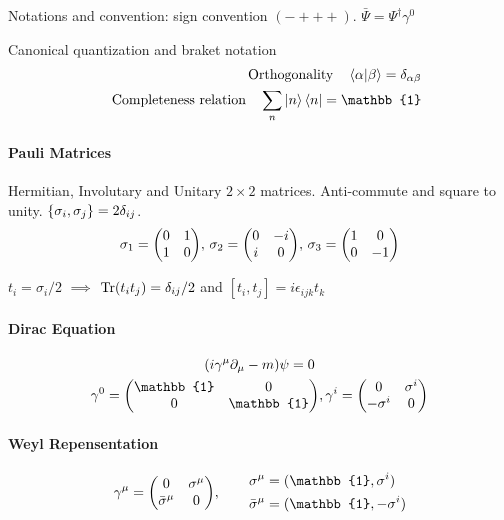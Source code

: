 \documentclass[main]{subfiles}
\begin{document}
\begin{multicols}{2}
    Notations and convention: sign convention $(-+++)$. $\bar{\Psi} = \Psi^\dagger\gamma^0$

    Canonical quantization and braket notation
    \begin{align}
        \qq{Orthogonality} \braket{\alpha}{\beta} = \delta_{\alpha\beta}\\
        \qq{Completeness relation} \sum_n\ket{n}\bra{n} = \mathbb{1}
    \end{align}
    
    \paragraph{Pauli Matrices} Hermitian, Involutary and Unitary $2\times2$ matrices. Anti-commute and square to unity. $\acomm{\sigma_i}{\sigma_j} = 2\delta_{ij}$.
    \begin{gather}
        \sigma_1 = \mqty(0 & 1 \\ 1 & 0),\,
        \sigma_2 = \mqty(0 & -i \\ i & 0),\,
        \sigma_3 = \mqty(1 & 0 \\ 0 & -1)
    \end{gather}

    $t_i = \sigma_i/2$ $\implies$ $\Tr(t_i t_j) = \delta_{ij}/2$ and $[t_i, t_j] = i\epsilon_{ijk}t_k$

    \paragraph{Dirac Equation}
    \begin{gather}
        (i\gamma^\mu\partial_\mu - m) \psi = 0\\
        \gamma^0 = \mqty(\mathbb{1} & 0 \\ 0 & \mathbb{1}), 
        \gamma^i = \mqty(0 & \sigma^i \\ -\sigma^i & 0)
    \end{gather}

    \paragraph{Weyl Repensentation}
    \begin{gather}
        \gamma^\mu = \mqty(0 & \sigma^\mu \\ \bar{\sigma}^\mu & 0), \qquad
        \begin{aligned}
            \sigma^\mu &= (\mathbb{1}, \sigma^i)\\
            \bar{\sigma}^\mu &= (\mathbb{1}, -\sigma^i)
        \end{aligned}
    \end{gather}
    
\end{multicols}
\end{document}
